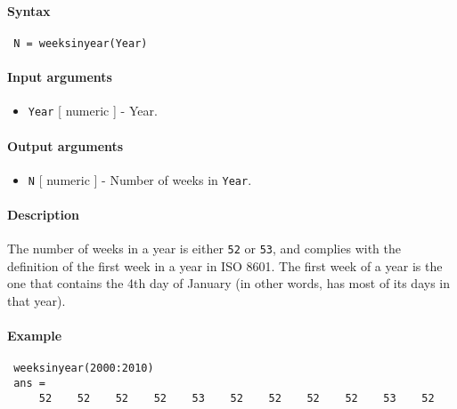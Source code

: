 


	\paragraph{Syntax}
 
 \begin{verbatim}
 N = weeksinyear(Year)
 \end{verbatim}
 
 \paragraph{Input arguments}
 
 \begin{itemize}
 \item
   \texttt{Year} {[} numeric {]} - Year.
 \end{itemize}
 
 \paragraph{Output arguments}
 
 \begin{itemize}
 \item
   \texttt{N} {[} numeric {]} - Number of weeks in \texttt{Year}.
 \end{itemize}
 
 \paragraph{Description}
 
 The number of weeks in a year is either \texttt{52} or \texttt{53}, and
 complies with the definition of the first week in a year in ISO 8601.
 The first week of a year is the one that contains the 4th day of January
 (in other words, has most of its days in that year).
 
 \paragraph{Example}
 
 \begin{verbatim}
 weeksinyear(2000:2010)
 ans =
     52    52    52    52    53    52    52    52    52    53    52
 \end{verbatim}


